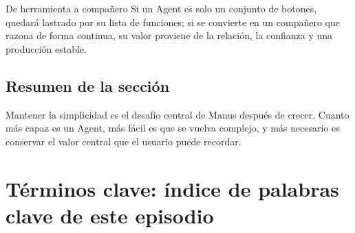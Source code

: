 \documentclass[a4paper]{article}
\begin{document}
\begin{importantbox}{De herramienta a compañero}
Si un Agent es solo un conjunto de botones, quedará lastrado por su lista de funciones; si se convierte en un compañero que razona de forma continua, su valor proviene de la relación, la confianza y una producción estable.
\end{importantbox}

\subsection{Resumen de la sección}

Mantener la simplicidad es el desafío central de Manus después de crecer. Cuanto más capaz es un Agent, más fácil es que se vuelva complejo, y más necesario es conservar el valor central que el usuario puede recordar.
\section{Términos clave: índice de palabras clave de este episodio}
\end{document}
